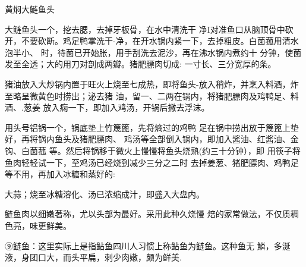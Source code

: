 \begin{recipe}{黄焖大鲢鱼头}

\ingredients









\cooking

\step 	大鲢鱼头一个，挖去腮，去掉牙板骨，在水中清洗干 净I对准鱼口从脑顶骨中砍开，不要砍断。鸡足鸭掌洗干-净，在开水锅内紧一下，去掉粗皮。白菌菰用清水泡半小、 时，待菌已开始胀，用手刮洗去泥沙，再在沸水锅内煮约十 分钟，使菌发至全透；大的用刀对剖成两瓣。猪肥膘肉切成: 一寸长、三分宽厚的条。

\step 	猪油放入大炒锅内置于旺火上烧至七成热，即将鱼头-放入稍炸，并烹入料酒，炸至略呈微黄色时捞出；泌去猪 油，留一、二两在锅内，将猪肥膘肉及鸡鸭足、料酒、.葱姜 放入痫一下，即加入鸡汤，开锅后撇去浮沫。

\step 	用头号铝锅一个，锅底垫上竹篾篦，先将熵过的鸡鸭 足在锅中捞出放于篾篦上垫好，再将锅内鱼头及猪肥膘肉、 鸡汤等全部倒入锅内，即加入酱油、红酱油、金钩、白菌菰 等。然后将锅移于微火上慢慢将鱼头烧熟(约三十分钟），即 用筷子将鱼肉轻轻试一下，至鸡汤已经烧到减少三分之二时 去掉姜葱、猪肥膘肉、鸡鸭足等不用，再加入冰糖和蒸好的:

大蒜；烧至冰糖溶化、汤已浓缩成汁，即盛入大盘内。

\notes

鲢鱼肉以细嫩著称，尤以头部为最好。采用此种久烧慢 焙的家常做法，不仅质稠色亮，味更鲜美。

⑨鲢鱼：这里实际上是指鲇鱼四川人习惯上称鲇鱼为鲢鱼。这种鱼无 鱗，多涎液，身团口大，而头平扁，刺少肉嫩，颇为鲜美.

\end{recipe}


